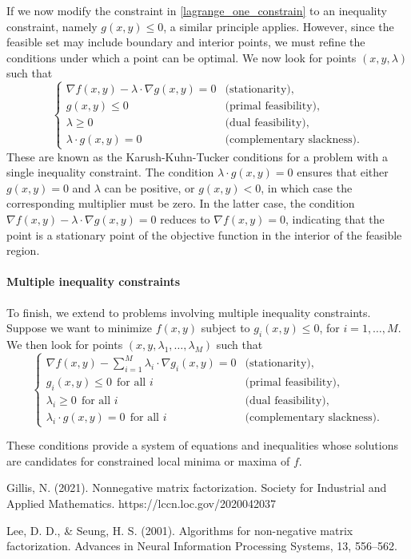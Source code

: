 \documentclass{amsart}
\begin{document}
If we now modify the constraint in \eqref{lagrange_one_constrain} to an inequality constraint, namely $g(x,y)\leq 0$, a similar principle applies. However, since the feasible set may include boundary and interior points, we must refine the conditions under which a point can be optimal. We now look for points $(x,y,\lambda)$ such that
\[\begin{cases}
    \nabla f(x,y) -\lambda\cdot \nabla g(x,y)= 0 & \text{(stationarity)},\\
    g(x,y)\leq 0 & \text{(primal feasibility)},\\
    \lambda\geq 0 & \text{(dual feasibility)},\\
    \lambda\cdot g(x,y)=0 & \text{(complementary slackness)}.
\end{cases}\]
These are known as the Karush-Kuhn-Tucker conditions for a problem with a single inequality constraint. The condition $\lambda\cdot g(x,y)=0$ ensures that either $g(x,y)=0$ and $\lambda$ can be positive, or $g(x,y)<0$, in which case the corresponding multiplier must be zero. In the latter case, the condition $\nabla f(x,y) -\lambda\cdot \nabla g(x,y)= 0$ reduces to $\nabla f(x,y)=0$, indicating that the point is a stationary point of the objective function in the interior of the feasible region.

\bigskip

\paragraph{\bf Multiple inequality constraints}

To finish, we extend to problems involving multiple inequality constraints. Suppose we want to minimize $f(x,y)$ subject to $g_i(x,y)\leq 0$, for $i=1,\ldots, M$. We then look for points $(x,y,\lambda_1,\ldots,\lambda_M)$ such that
\begin{equation}
    \label{KKT_conditions}
    \begin{cases}
    \nabla f(x,y) -\sum_{i=1}^M \lambda_i\cdot \nabla g_i(x,y)= 0& \text{(stationarity),}\\
    g_i(x,y)\leq 0\ \ \text{for all $i$} & \text{(primal feasibility),}\\
    \lambda_i\geq 0\ \ \text{for all $i$} & \text{(dual feasibility),}\\
    \lambda_i\cdot g(x,y)= 0\ \ \text{for all $i$} & \text{(complementary slackness).}
    \end{cases}
\end{equation}

These conditions provide a system of equations and inequalities whose solutions are candidates for constrained local minima or maxima of $f$.


\begin{thebibliography}{9}
    Gillis, N. (2021). Nonnegative matrix factorization. Society for Industrial and Applied Mathematics. https://lccn.loc.gov/2020042037

    Lee, D. D., \& Seung, H. S. (2001). Algorithms for non-negative matrix factorization. Advances in Neural Information Processing Systems, 13, 556–562.
\end{thebibliography}
\end{document}
